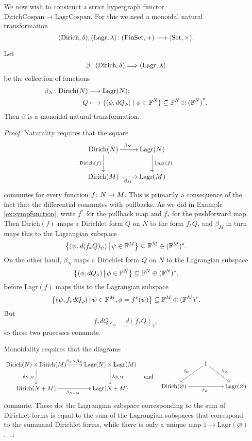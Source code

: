 We now wish to construct a strict hypergraph functor
$\mathrm{DirichCospan} \to \mathrm{LagrCospan}$.  For this we need a monoidal natural transformation 
\[
  (\mathrm{Dirich},\delta), (\mathrm{Lagr},\lambda){\colon} (\mathrm{FinSet},+)
  \longrightarrow (\mathrm{Set},\times).
\]
\begin{proposition}
Let
\[
  \beta{\colon} (\mathrm{Dirich},\delta) \Longrightarrow (\mathrm{Lagr},\lambda)
\]
be the collection of functions
\begin{align*}
  \beta_N{\colon} \mathrm{Dirich}(N) &\longrightarrow \mathrm{Lagr}(N); \\
  Q &\longmapsto \{(\phi,dQ_\phi) \mid \phi \in {\mathbb F}^N\} \subseteq {{\mathbb F}^{N} \oplus {({\mathbb F}^{N})}^\ast}.
\end{align*}
Then $\beta$ is a monoidal natural transformation.
\end{proposition}

\begin{proof}
Naturality requires that the square
\[
\xymatrix{
  \mathrm{Dirich}(N) \ar[r]^{\beta_N} \ar[d]_{\mathrm{Dirich}(f)} &
  \mathrm{Lagr}(N) \ar[d]^{\mathrm{Lagr}(f)}  \\
  \mathrm{Dirich}(M) \ar[r]_{\beta_M} & \mathrm{Lagr}(M)
}
\]
commutes for every function $f{\colon} N \to M$. This is primarily a consequence of the
fact that the differential commutes with pullbacks. As we did in Example
\ref{ex:sympfunction},
write $f^\ast$ for the pullback map and $f_\ast$ for the pushforward map.
Then $\mathrm{Dirich}(f)$ maps a Dirichlet form $Q$ on $N$ to the form $f_\ast Q$,
and $\beta_M$ in turn maps this to the Lagrangian subspace 
\[
  \big\{(\psi,d(f_\ast Q)_\psi) \, \big\vert \, \psi \in {\mathbb F}^M\big\} \subseteq
  {\mathbb F}^M \oplus ({\mathbb F}^M)^\ast.
\]
On the other hand, $\beta_N$ maps a Dirichlet form $Q$ on $N$ to the Lagrangian
subspace
\[
\big\{(\phi,dQ_\phi) \,\big\vert\, \phi \in {\mathbb F}^N\big\}\subseteq
  {\mathbb F}^N \oplus ({\mathbb F}^N)^\ast, 
\]
before $\mathrm{Lagr}(f)$ maps this to the Lagrangian subspace
\[
  \big\{(\psi, f_\ast dQ_\phi) \,\big\vert\, \psi \in {\mathbb F}^M, \phi =
  f^\ast(\psi)\big\} \subseteq {\mathbb F}^M\oplus ({\mathbb F}^M)^\ast.
\]
But 
\[
  f_\ast dQ_{f^\ast\psi} = d(f_\ast Q)_{\psi},
\]
so these two processes commute.

Monoidality requires that the diagrams 
\[
\begin{aligned}
\xymatrix{
  \mathrm{Dirich}(N) \times \mathrm{Dirich}(M) \ar[r]^(.52){\beta_N \times
  \beta_M} \ar[d]_{\delta_{N,M}} & \mathrm{Lagr}(N) \times \mathrm{Lagr}(M)
  \ar[d]^{\lambda_{N,M}}  \\
  \mathrm{Dirich}(N+M) \ar[r]_{\beta_{N+M}} & \mathrm{Lagr}(N+M)
}
\end{aligned}
\quad
\mbox{and}
\quad
\begin{aligned}
\xymatrix{
  & 1 \ar[dl]_{\delta_\varnothing} \ar[dr]^{\lambda_\varnothing}\\
\mathrm{Dirich}(\varnothing)  \ar[rr]_{\beta_\varnothing} &&
\mathrm{Lagr}(\varnothing)
}
\end{aligned}
\]
commute. These do: the Lagrangian subspace corresponding to the sum of Dirichlet
forms is equal to the sum of the Lagrangian subspaces that correspond to the
summand Dirichlet forms, while there is only a unique map $1 \to
\mathrm{Lagr}(\varnothing)$.
\end{proof}

